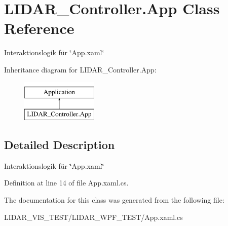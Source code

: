\hypertarget{class_l_i_d_a_r___controller_1_1_app}{}\section{L\+I\+D\+A\+R\+\_\+\+Controller.\+App Class Reference}
\label{class_l_i_d_a_r___controller_1_1_app}


Interaktionslogik für \char`\"{}\+App.\+xaml\char`\"{}  


Inheritance diagram for L\+I\+D\+A\+R\+\_\+\+Controller.\+App\+:\begin{figure}[H]
\begin{center}
\leavevmode
\includegraphics[height=2.000000cm]{class_l_i_d_a_r___controller_1_1_app}
\end{center}
\end{figure}


\subsection{Detailed Description}
Interaktionslogik für \char`\"{}\+App.\+xaml\char`\"{} 



Definition at line 14 of file App.\+xaml.\+cs.



The documentation for this class was generated from the following file\+:\begin{DoxyCompactItemize}
\item 
L\+I\+D\+A\+R\+\_\+\+V\+I\+S\+\_\+\+T\+E\+S\+T/\+L\+I\+D\+A\+R\+\_\+\+W\+P\+F\+\_\+\+T\+E\+S\+T/App.\+xaml.\+cs\end{DoxyCompactItemize}
